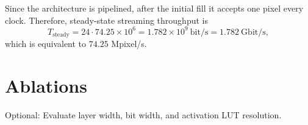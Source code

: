 Since the architecture is pipelined, after the initial fill it accepts one pixel every clock. Therefore, steady-state streaming throughput is
\begin{equation}
T_{\text{steady}} = 24 \cdot 74.25 \times 10^{6}
                  = 1.782 \times 10^{9}\ \text{bit/s}
                  = 1.782\ \text{Gbit/s},
\end{equation}
which is equivalent to \(74.25\) Mpixel/s.

\section{Ablations}
Optional: Evaluate layer width, bit width, and activation LUT resolution.
